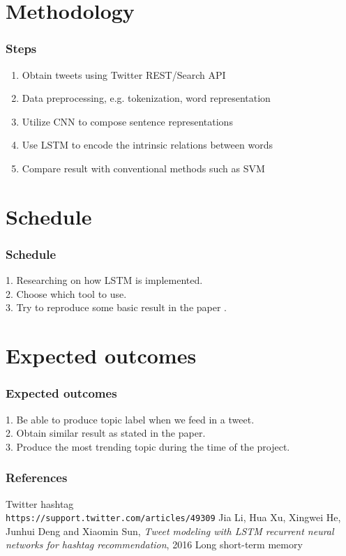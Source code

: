 \documentclass{beamer}
\begin{document}
\section{Methodology}
\begin{frame}
\frametitle{Steps}
\begin{enumerate}
\item Obtain tweets using Twitter REST/Search API 
\item Data preprocessing, e.g. tokenization, word representation
\item Utilize CNN to compose sentence representations
\item Use LSTM to encode the intrinsic relations between words
\item Compare result with conventional methods such as SVM
\end{enumerate}
\end{frame}

\section{Schedule}
\begin{frame}
\frametitle{Schedule}
1. Researching on how LSTM is implemented.\\
2. Choose which tool to use.\\
3. Try to reproduce some basic result in the paper \cite{paper}.\\
\end{frame}
\section{Expected outcomes}
\begin{frame}
\frametitle{Expected outcomes}
1. Be able to produce topic label when we feed in a tweet.\\
2. Obtain similar result as stated in the paper. \\
3. Produce the most trending topic during the time of the project.\\
\end{frame}
\begin{frame}
\frametitle{References}
\begin{thebibliography}{9}
	Twitter hashtag
	\\\texttt{https://support.twitter.com/articles/49309}
	Jia Li, Hua Xu, Xingwei He, Junhui Deng and Xiaomin Sun, 
	\textit{Tweet modeling with LSTM recurrent neural networks for hashtag recommendation}, 2016
	Long short-term memory\\
\end{thebibliography}
\end{frame}

\end{document}
